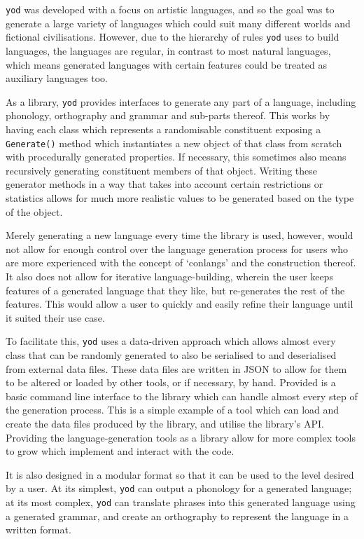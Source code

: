 \documentclass{report}
\begin{document}
   \texttt{yod} was developed with a focus on artistic languages, and so the goal was to generate a large variety of languages which could suit many different worlds and fictional civilisations. However, due to the hierarchy of rules \texttt{yod} uses to build languages, the languages are regular, in contrast to most natural languages, which means generated languages with certain features could be treated as auxiliary languages too.
   
   As a library, \texttt{yod} provides interfaces to generate any part of a language, including phonology, orthography and grammar and sub-parts thereof. This works by having each class which represents a randomisable constituent exposing a \texttt{Generate()} method which instantiates a new object of that class from scratch with procedurally generated properties. If necessary, this sometimes also means recursively generating constituent members of that object. Writing these generator methods in a way that takes into account certain restrictions or statistics allows for much more realistic values to be generated based on the type of the object.
   
   Merely generating a new language every time the library is used, however, would not allow for enough control over the language generation process for users who are more experienced with the concept of `conlangs' and the construction thereof. It also does not allow for iterative language-building, wherein the user keeps features of a generated language that they like, but re-generates the rest of the features. This would allow a user to quickly and easily refine their language until it suited their use case.
   
   To facilitate this, \texttt{yod} uses a data-driven approach which allows almost every class that can be randomly generated to also be serialised to and deserialised from external data files. These data files are written in JSON to allow for them to be altered or loaded by other tools, or if necessary, by hand. Provided is a basic command line interface to the library which can handle almost every step of the generation process. This is a simple example of a tool which can load and create the data files produced by the library, and utilise the library's API. Providing the language-generation tools as a library allow for more complex tools to grow which implement and interact with the code.
   
   It is also designed in a modular format so that it can be used to the level desired by a user. At its simplest, \texttt{yod} can output a phonology for a generated language; at its most complex, \texttt{yod} can translate phrases into this generated language using a generated grammar, and create an orthography to represent the language in a written format.
   
\end{document}
